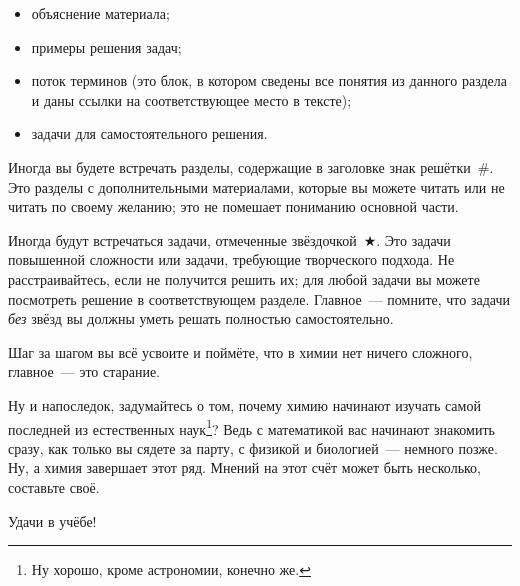 \begin{itemize}
    \item объяснение материала;
    \item примеры решения задач;
    \item поток терминов (это блок, в котором сведены все понятия из данного раздела и даны ссылки на соответствующее место в тексте);
    \item задачи для самостоятельного решения.
\end{itemize}

Иногда вы будете встречать разделы, содержащие в заголовке знак решётки~\#. Это разделы с дополнительными материалами, которые вы можете читать или не читать по своему желанию; это не помешает пониманию основной части.

Иногда будут встречаться задачи, отмеченные звёздочкой~$\bigstar$. Это задачи повышенной сложности или задачи, требующие творческого подхода. Не расстраивайтесь, если не получится решить их; для любой задачи вы можете посмотреть решение в соответствующем разделе. Главное~--- помните, что задачи \emph{без} звёзд вы должны уметь решать полностью самостоятельно.

Шаг за шагом вы всё усвоите и поймёте, что в химии нет ничего сложного, главное~--- это старание.

Ну и напоследок, задумайтесь о том, почему химию начинают изучать самой последней из естественных наук\footnote{Ну хорошо, кроме астрономии, конечно же.}? Ведь с математикой вас начинают знакомить сразу, как только вы сядете за парту, с физикой и биологией~--- немного позже. Ну, а химия завершает этот ряд. Мнений на этот счёт может быть несколько, составьте своё.

Удачи в учёбе!
